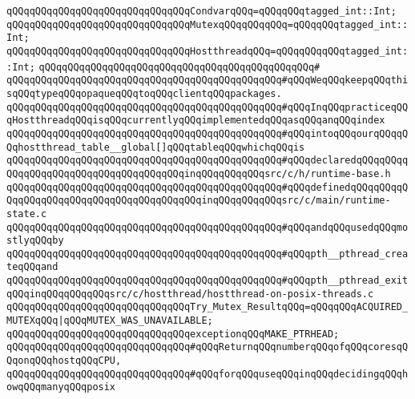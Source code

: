 \verb|qQQqqQQqqQQqqQQqqQQqqQQqqQQqqQQqCondvarqQQq=qQQqqQQqtagged_int::Int;|\newline
\verb|qQQqqQQqqQQqqQQqqQQqqQQqqQQqqQQqMutexqQQqqQQqqQQq=qQQqqQQqtagged_int::Int;|\newline
\newline
\verb|qQQqqQQqqQQqqQQqqQQqqQQqqQQqqQQqHostthreadqQQq=qQQqqQQqqQQqtagged_int::Int;|\newline
\verb|qQQqqQQqqQQqqQQqqQQqqQQqqQQqqQQqqQQqqQQqqQQqqQQq#|\newline
\verb|qQQqqQQqqQQqqQQqqQQqqQQqqQQqqQQqqQQqqQQqqQQqqQQq#qQQqWeqQQqkeepqQQqthisqQQqtypeqQQqopaqueqQQqtoqQQqclientqQQqpackages.|\newline
\verb|qQQqqQQqqQQqqQQqqQQqqQQqqQQqqQQqqQQqqQQqqQQqqQQq#qQQqInqQQqpracticeqQQqHostthreadqQQqisqQQqcurrentlyqQQqimplementedqQQqasqQQqanqQQqindex|\newline
\verb|qQQqqQQqqQQqqQQqqQQqqQQqqQQqqQQqqQQqqQQqqQQqqQQq#qQQqintoqQQqourqQQqqQQqhostthread_table__global[]qQQqtableqQQqwhichqQQqis|\newline
\verb|qQQqqQQqqQQqqQQqqQQqqQQqqQQqqQQqqQQqqQQqqQQqqQQq#qQQqdeclaredqQQqqQQqqQQqqQQqqQQqqQQqqQQqqQQqqQQqqQQqinqQQqqQQqqQQqsrc/c/h/runtime-base.h|\newline
\verb|qQQqqQQqqQQqqQQqqQQqqQQqqQQqqQQqqQQqqQQqqQQqqQQq#qQQqdefinedqQQqqQQqqQQqqQQqqQQqqQQqqQQqqQQqqQQqqQQqqQQqinqQQqqQQqqQQqsrc/c/main/runtime-state.c|\newline
\verb|qQQqqQQqqQQqqQQqqQQqqQQqqQQqqQQqqQQqqQQqqQQqqQQq#qQQqandqQQqusedqQQqmostlyqQQqby|\newline
\verb|qQQqqQQqqQQqqQQqqQQqqQQqqQQqqQQqqQQqqQQqqQQqqQQq#qQQqpth__pthread_createqQQqand|\newline
\verb|qQQqqQQqqQQqqQQqqQQqqQQqqQQqqQQqqQQqqQQqqQQqqQQq#qQQqpth__pthread_exitqQQqinqQQqqQQqqQQqsrc/c/hostthread/hostthread-on-posix-threads.c|\newline
\newline
\verb|qQQqqQQqqQQqqQQqqQQqqQQqqQQqqQQqTry_Mutex_ResultqQQq=qQQqqQQqACQUIRED_MUTEXqQQq|\verb#|qQQqMUTEX_WAS_UNAVAILABLE;#\newline
\newline
\verb|qQQqqQQqqQQqqQQqqQQqqQQqqQQqqQQqexceptionqQQqMAKE_PTRHEAD;|\newline
\newline
\verb|qQQqqQQqqQQqqQQqqQQqqQQqqQQqqQQq#qQQqReturnqQQqnumberqQQqofqQQqcoresqQQqonqQQqhostqQQqCPU,|\newline
\verb|qQQqqQQqqQQqqQQqqQQqqQQqqQQqqQQq#qQQqforqQQquseqQQqinqQQqdecidingqQQqhowqQQqmanyqQQqposix|\newline

